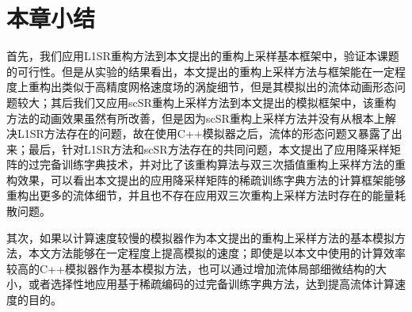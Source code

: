 \section{本章小结}

首先，我们应用L1SR重构方法到本文提出的重构上采样基本框架中，验证本课题的可行性。但是从实验的结果看出，本文提出的重构上采样方法与框架能在一定程度上重构出类似于高精度网格速度场的涡旋细节，但是其模拟出的流体动画形态问题较大；其后我们又应用scSR重构上采样方法到本文提出的模拟框架中，该重构方法的动画效果虽然有所改善，但是因为scSR重构上采样方法并没有从根本上解决L1SR方法存在的问题，故在使用C++模拟器之后，流体的形态问题又暴露了出来；最后，针对L1SR方法和scSR方法存在的共同问题，本文提出了应用降采样矩阵的过完备训练字典技术，并对比了该重构算法与双三次插值重构上采样方法的重构效果，可以看出本文提出的应用降采样矩阵的稀疏训练字典方法的计算框架能够重构出更多的流体细节，并且也不存在应用双三次重构上采样方法时存在的能量耗散问题。

其次，如果以计算速度较慢的模拟器作为本文提出的重构上采样方法的基本模拟方法，本文方法能够在一定程度上提高模拟的速度；即使是以本文中使用的计算效率较高的C++模拟器作为基本模拟方法，也可以通过增加流体局部细微结构的大小，或者选择性地应用基于稀疏编码的过完备训练字典方法，达到提高流体计算速度的目的。

